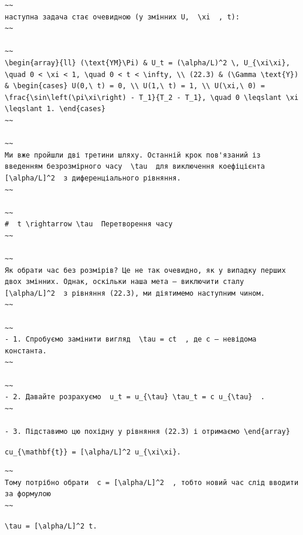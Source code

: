 \documentclass[
  ukrainian,
]{article}
\begin{document}
\begin{verbatim}
~~
наступна задача стає очевидною (у змінних U,  \xi  , t):
~~

~~
\begin{array}{ll} (\text{YM}\Pi) & U_t = (\alpha/L)^2 \, U_{\xi\xi}, \quad 0 < \xi < 1, \quad 0 < t < \infty, \\ (22.3) & (\Gamma \text{Y}) & \begin{cases} U(0,\ t) = 0, \\ U(1,\ t) = 1, \\ U(\xi,\ 0) = \frac{\sin\left(\pi\xi\right) - T_1}{T_2 - T_1}, \quad 0 \leqslant \xi \leqslant 1. \end{cases}
~~

~~
Ми вже пройшли дві третини шляху. Останній крок пов'язаний із введенням безрозмірного часу  \tau  для виключення коефіцієнта  [\alpha/L]^2  з диференціального рівняння.
~~

~~
#  t \rightarrow \tau  Перетворення часу
~~

~~
Як обрати час без розмірів? Це не так очевидно, як у випадку перших двох змінних. Однак, оскільки наша мета — виключити сталу  [\alpha/L]^2  з рівняння (22.3), ми діятимемо наступним чином.
~~

~~
- 1. Спробуємо замінити вигляд  \tau = ct  , де c — невідома константа.
~~

~~
- 2. Давайте розрахуємо  u_t = u_{\tau} \tau_t = c u_{\tau}  .
~~

- 3. Підставимо цю похідну у рівняння (22.3) і отримаємо \end{array}
\end{verbatim}

\texttt{cu\_\{\textbackslash{}mathbf\{t\}\}\ =\ {[}\textbackslash{}alpha/L{]}\^{}2\ u\_\{\textbackslash{}xi\textbackslash{}xi\}.}

\begin{verbatim}
~~
Тому потрібно обрати  c = [\alpha/L]^2  , тобто новий час слід вводити за формулою
~~
\end{verbatim}

\texttt{\textbackslash{}tau\ =\ {[}\textbackslash{}alpha/L{]}\^{}2\ t.}
\end{document}
